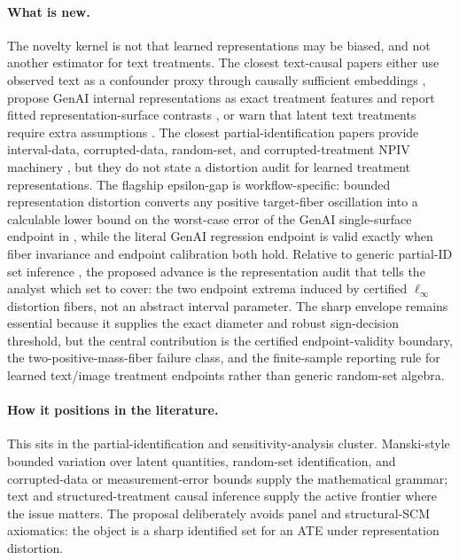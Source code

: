 \documentclass[11pt]{article}
\theoremstyle{definition}
\theoremstyle{plain}
\theoremstyle{remark}
\begin{document}
\paragraph{What is new.}
The novelty kernel is not that learned representations may be biased, and not another estimator for text treatments.  The closest text-causal papers either use observed text as a confounder proxy through causally sufficient embeddings \citep{VeitchSridharBlei2020}, propose GenAI internal representations as exact treatment features and report fitted representation-surface contrasts \citep{ImaiNakamura2024TextTreatments,ImaiNakamura2025GPI}, or warn that latent text treatments require extra assumptions \citep{FongGrimmer2023}.  The closest partial-identification papers provide interval-data, corrupted-data, random-set, and corrupted-treatment NPIV machinery \citep{HorowitzManski1995,ManskiTamer2002,BeresteanuMolchanovMolinari2012,ZhuGultchinGrettonKusnerSilva2022}, but they do not state a distortion audit for learned treatment representations.  The flagship epsilon-gap is workflow-specific: bounded representation distortion converts any positive target-fiber oscillation into a calculable lower bound on the worst-case error of the GenAI single-surface endpoint in \citet{ImaiNakamura2024TextTreatments}, while the literal GenAI regression endpoint is valid exactly when fiber invariance and endpoint calibration both hold.  Relative to generic partial-ID set inference \citep{ImbensManski2004,Stoye2009}, the proposed advance is the representation audit that tells the analyst which set to cover: the two endpoint extrema induced by certified \(\ell_\infty\) distortion fibers, not an abstract interval parameter.  The sharp envelope remains essential because it supplies the exact diameter and robust sign-decision threshold, but the central contribution is the certified endpoint-validity boundary, the two-positive-mass-fiber failure class, and the finite-sample reporting rule for learned text/image treatment endpoints rather than generic random-set algebra.

\paragraph{How it positions in the literature.}
This sits in the partial-identification and sensitivity-analysis cluster.  Manski-style bounded variation over latent quantities, random-set identification, and corrupted-data or measurement-error bounds supply the mathematical grammar; text and structured-treatment causal inference supply the active frontier where the issue matters.  The proposal deliberately avoids panel and structural-SCM axiomatics: the object is a sharp identified set for an ATE under representation distortion.
\end{document}
